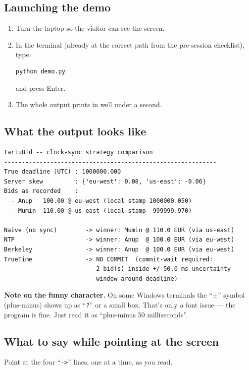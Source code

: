 \documentclass[a4paper,11pt]{article}
\begin{document}
\subsection*{Launching the demo}

\begin{enumerate}[leftmargin=*]
  \item Turn the laptop so the visitor can see the screen.
  \item In the terminal (already at the correct path from the
        pre-session checklist), type:
\begin{verbatim}
python demo.py
\end{verbatim}
        and press Enter.
  \item The whole output prints in well under a second.
\end{enumerate}

\subsection*{What the output looks like}

\begin{verbatim}
TartuBid -- clock-sync strategy comparison
------------------------------------------------------------
True deadline (UTC) : 1000000.000
Server skew         : {'eu-west': 0.08, 'us-east': -0.06}
Bids as recorded    :
  - Anup   100.00 @ eu-west (local stamp 1000000.050)
  - Mumin  110.00 @ us-east (local stamp  999999.970)

Naive (no sync)        -> winner: Mumin @ 110.0 EUR (via us-east)
NTP                    -> winner: Anup  @ 100.0 EUR (via eu-west)
Berkeley               -> winner: Anup  @ 100.0 EUR (via eu-west)
TrueTime               -> NO COMMIT  (commit-wait required:
                          2 bid(s) inside +/-50.0 ms uncertainty
                          window around deadline)
\end{verbatim}

\textbf{Note on the funny character.} On some Windows terminals
the ``$\pm$'' symbol (plus-minus) shows up as ``\texttt{?}'' or a
small box. That's only a font issue --- the program is fine. Just
read it as ``plus-minus 50 milliseconds''.

\subsection*{What to say while pointing at the screen}

Point at the four ``\texttt{->}'' lines, one at a time, as you
read.
\end{document}
